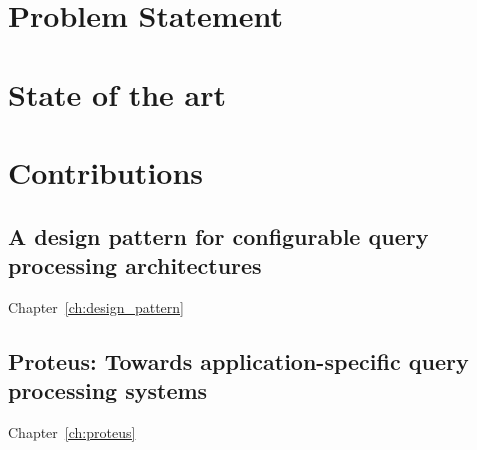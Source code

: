 \section{Problem Statement}

\section{State of the art}






\section{Contributions}
\subsection{A design pattern for configurable query processing architectures}
Chapter~\ref{ch:design_pattern}

\subsection{Proteus: Towards application-specific query processing systems}
Chapter~\ref{ch:proteus}
